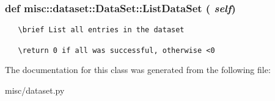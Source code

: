 \subsubsection{\setlength{\rightskip}{0pt plus 5cm}def misc::dataset::Data\-Set::List\-Data\-Set ( {\em self})}\label{classmisc_1_1dataset_1_1DataSet_664c8b68c0e74d3067ed90050a7a35fd}




\footnotesize\begin{verbatim}
   \brief List all entries in the dataset

   \return 0 if all was successful, otherwise <0
\end{verbatim}
\normalsize
 

The documentation for this class was generated from the following file:\begin{CompactItemize}
\item 
misc/dataset.py\end{CompactItemize}

